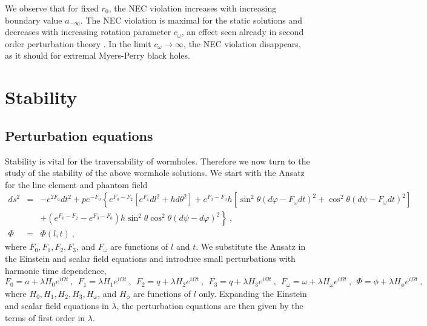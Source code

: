 \documentclass[showpacs,preprintnumbers,amsmath,amssymb,floatfix]{revtex4}
\begin{document}
We observe that for fixed $r_0$, the NEC violation
increases with increasing boundary value $a_{-\infty}$.
The NEC violation is maximal for the static solutions
and decreases with increasing rotation parameter $c_\omega$,
an effect seen already in second order perturbation theory \cite{Kashargin:2008pk}.
In the limit $c_\omega \to \infty$, the NEC violation disappears,
as it should for extremal Myers-Perry black holes.




\section{Stability}

\subsection{Perturbation equations}

Stability is vital for the traversability of wormholes.
Therefore we now turn to the 
study of the stability 
of the above wormhole solutions.
We start with the Ansatz for the line element 
and phantom field
%
\begin{eqnarray}
ds^2 & = &  -e^{2F_0} dt^2 + p e^{-F_0}\left\{
e^{F_0-F_2}\left[e^{F_1}dl^2 +h d\theta^2\right]
                   + e^{F_3-F_0}
		   h\left[ \sin^2\theta (d\varphi -F_\omega dt)^2
		         +\cos^2\theta (d\psi -F_\omega dt)^2\right]\right.
\nonumber\\
& &			\left.
			+\left(e^{F_0-F_2}- e^{F_3-F_0}\right)
			h \sin^2\theta\cos^2\theta(d\psi -d\varphi)^2
			\right\}
\ , \label{pertlineel}
\\
\Phi & = & \Phi(l,t) 
\ , \label{pertphi}
\end{eqnarray}
%
where $F_0, F_1, F_2, F_3$, and $F_\omega$ are functions of $l$ and $t$.
We substitute the Ansatz
in the Einstein and scalar field equations and introduce small
perturbations with harmonic time dependence,
\begin{equation}
F_0= a + \lambda H_0 e^{i \Omega t} \ , \ \  
F_1=     \lambda H_1 e^{i \Omega t} \ , \ \  
F_2= q + \lambda H_2 e^{i \Omega t} \ , \ \  
F_3= q + \lambda H_3 e^{i \Omega t} \ , \ \ 
F_\omega= \omega + \lambda H_\omega e^{i \Omega t} \ , \ \  
\Phi= \phi  + \lambda H_\phi e^{i \Omega t} \ , 
\end{equation}
where $H_0, H_1, H_2, H_3, H_\omega$, and $H_\phi$ are functions of $l$ only.
Expanding the Einstein and scalar field equations in $\lambda$,
the perturbation equations are then given by the terms of first order 
in $\lambda$.
\end{document}
